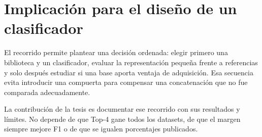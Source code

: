 \section{Implicación para el diseño de un clasificador}
El recorrido permite plantear una decisión ordenada: elegir primero una biblioteca y un clasificador, evaluar la representación pequeña frente a referencias y solo después estudiar si una base aporta ventaja de adquisición. Esa secuencia evita introducir una compuerta para compensar una concatenación que no fue comparada adecuadamente.

La contribución de la tesis es documentar ese recorrido con sus resultados y límites. No depende de que Top-4 gane todos los datasets, de que el margen siempre mejore F1 o de que se igualen porcentajes publicados.

